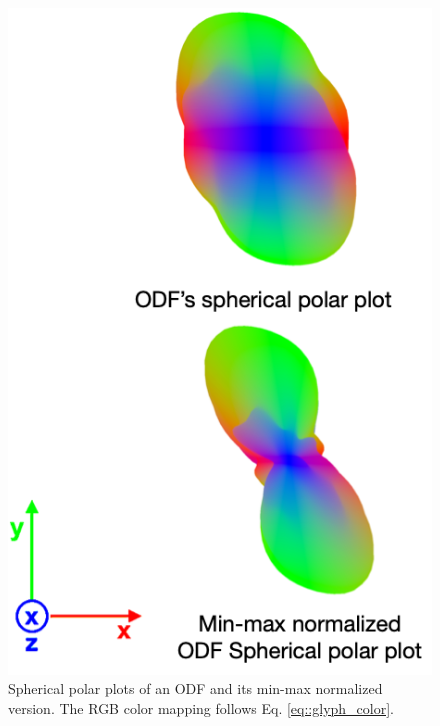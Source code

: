 \documentclass[twoside,twocolumn,10pt]{article}
\begin{document}
\begin{figure}[htb]
    \centering
    \includegraphics[width=.45\linewidth, angle=0]{figs/SphericalMeshModulation.png}
    \caption{Spherical polar plots of an ODF and its min-max normalized version. The RGB color mapping follows Eq. \ref{eq::glyph_color}.}
    \label{fig::intro_glyph}
\end{figure}


\end{document}

